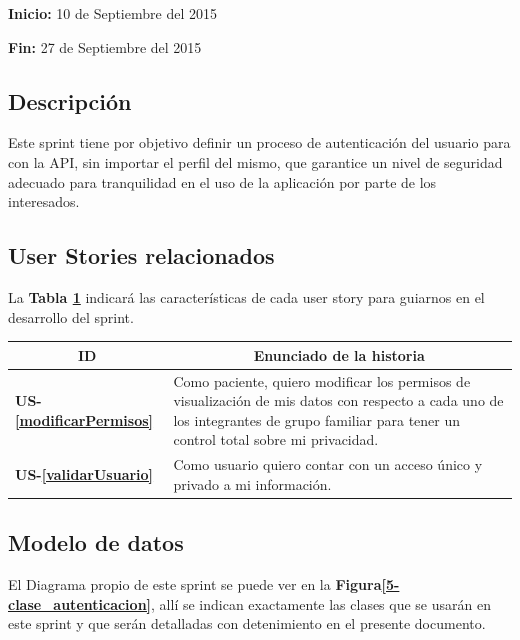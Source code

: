 \documentclass[a4paper,12pt]{article}
\begin{document}
	\textbf{Inicio: } 10 de Septiembre del 2015
	
	\textbf{Fin:} 27 de Septiembre del 2015 



\subsection{Descripción}

Este sprint tiene por objetivo definir un proceso de autenticación del usuario para con la API, sin importar el perfil del mismo, que garantice un nivel de seguridad adecuado para tranquilidad en el uso de la aplicación por parte de los interesados. 

\subsection{User Stories relacionados}
La \textbf{Tabla \ref{US-Sprint5} } indicará las características de cada user story para guiarnos en el desarrollo del sprint.

\begin{table}[h]
    \label{US-Sprint5}
    \centering
	\begin{tabular}{|l|p{9cm}|}
	\hline
        \multicolumn{1}{|c|}{\textbf{ID}} &
        \multicolumn{1}{|c|}{\textbf{Enunciado de la historia}} \\          
    \hline
        \textbf{US-\ref{modificarPermisos}} & Como paciente, quiero modificar los permisos de visualización de mis datos con respecto a cada uno de los integrantes de grupo familiar para tener un control total sobre mi privacidad. \\
     \hline 
        \textbf{US-\ref{validarUsuario} } & Como usuario quiero contar con un acceso único y privado a mi información. \\
     \hline 
     
    \end{tabular}

\end{table}
\subsection{Modelo de datos}
El Diagrama propio de este sprint se puede ver en la \textbf{Figura\ref{5-clase_autenticacion}}, allí se indican exactamente las clases que se usarán en este sprint y que serán detalladas con detenimiento en el presente documento. 
\end{document}
